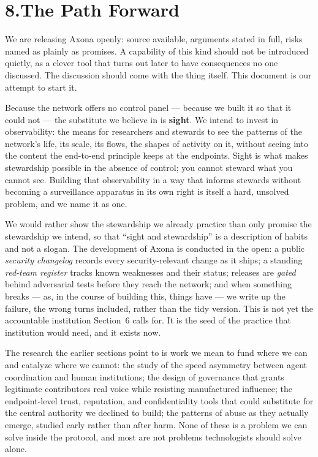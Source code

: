 \documentclass[nobib,justified]{tufte-handout}
\begin{document}
\section{8.\quad The Path Forward}

We are releasing Axona openly: source available, arguments stated in full, risks
named as plainly as promises. A capability of this kind should not be introduced
quietly, as a clever tool that turns out later to have consequences no one
discussed. The discussion should come with the thing itself. This document is our
attempt to start it.

Because the network offers no control panel --- because we built it so that it
could not --- the substitute we believe in is \textbf{sight}. We intend to invest
in observability: the means for researchers and stewards to see the patterns of
the network's life, its scale, its flows, the shapes of activity on it, without
seeing into the content the end-to-end principle keeps at the endpoints. Sight is
what makes stewardship possible in the absence of control; you cannot steward what
you cannot see. Building that observability in a way that informs stewards without
becoming a surveillance apparatus in its own right is itself a hard, unsolved
problem, and we name it as one.

We would rather show the stewardship we already practice than only promise the
stewardship we intend, so that ``sight and stewardship'' is a description of habits
and not a slogan. The development of Axona is conducted in the open: a public
\emph{security changelog} records every security-relevant change as it ships; a
standing \emph{red-team register} tracks known weaknesses and their status;
releases are \emph{gated} behind adversarial tests before they reach the network;
and when something breaks --- as, in the course of building this, things have ---
we write up the failure, the wrong turns included, rather than the tidy version.
This is not yet the accountable institution Section~6 calls for. It is the seed of
the practice that institution would need, and it exists now.

The research the earlier sections point to is work we mean to fund where we can and
catalyze where we cannot: the study of the speed asymmetry between agent
coordination and human institutions; the design of governance that grants
legitimate contributors real voice while resisting manufactured influence; the
endpoint-level trust, reputation, and confidentiality tools that could substitute
for the central authority we declined to build; the patterns of abuse as they
actually emerge, studied early rather than after harm. None of these is a problem
we can solve inside the protocol, and most are not problems technologists should
solve alone.
\end{document}

